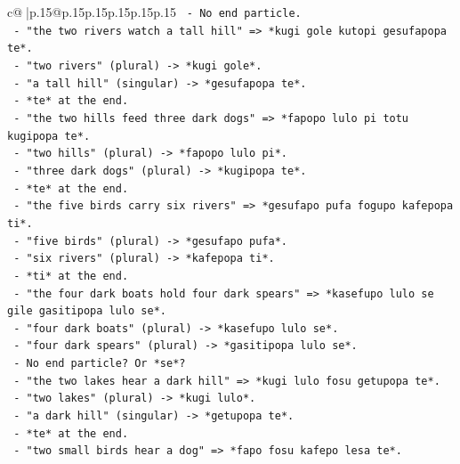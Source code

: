 \documentclass{article}
\begin{document}
{\begin{supertabular}{c@{$\;$}|p{.15\linewidth}@{}p{.15\linewidth}p{.15\linewidth}p{.15\linewidth}p{.15\linewidth}p{.15\linewidth}}
{{{\texttt{                  {-} No end particle.} \\
\texttt{                {-} "the two rivers watch a tall hill" => *kugi gole kutopi gesufapopa te*.} \\
\texttt{                  {-} "two rivers" (plural) {-}> *kugi gole*.} \\
\texttt{                  {-} "a tall hill" (singular) {-}> *gesufapopa te*.} \\
\texttt{                  {-} *te* at the end.} \\
\texttt{                {-} "the two hills feed three dark dogs" => *fapopo lulo pi totu kugipopa te*.} \\
\texttt{                  {-} "two hills" (plural) {-}> *fapopo lulo pi*.} \\
\texttt{                  {-} "three dark dogs" (plural) {-}> *kugipopa te*.} \\
\texttt{                  {-} *te* at the end.} \\
\texttt{                {-} "the five birds carry six rivers" => *gesufapo pufa fogupo kafepopa ti*.} \\
\texttt{                  {-} "five birds" (plural) {-}> *gesufapo pufa*.} \\
\texttt{                  {-} "six rivers" (plural) {-}> *kafepopa ti*.} \\
\texttt{                  {-} *ti* at the end.} \\
\texttt{                {-} "the four dark boats hold four dark spears" => *kasefupo lulo se gile gasitipopa lulo se*.} \\
\texttt{                  {-} "four dark boats" (plural) {-}> *kasefupo lulo se*.} \\
\texttt{                  {-} "four dark spears" (plural) {-}> *gasitipopa lulo se*.} \\
\texttt{                  {-} No end particle? Or *se*?} \\
\texttt{                {-} "the two lakes hear a dark hill" => *kugi lulo fosu getupopa te*.} \\
\texttt{                  {-} "two lakes" (plural) {-}> *kugi lulo*.} \\
\texttt{                  {-} "a dark hill" (singular) {-}> *getupopa te*.} \\
\texttt{                  {-} *te* at the end.} \\
\texttt{                {-} "two small birds hear a dog" => *fapo fosu kafepo lesa te*.} \\
}}}
\end{supertabular}}
\end{document}

